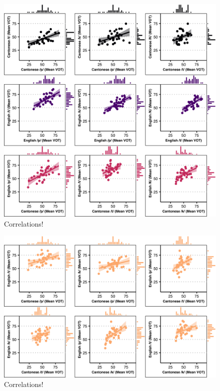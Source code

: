 \begin{figure}[htbp]
  \begin{center}
  \includegraphics[width=0.9\linewidth]{figures/ch4_correlations1_5in.png} 
  \caption{Correlations!}
  \label{ch4:fig:correlations1}
  \end{center}
\end{figure}

\begin{figure}[htbp]
  \begin{center}
  \includegraphics[width=0.9\linewidth]{figures/ch4_correlations2_5in.png} 
  \caption{Correlations!}
  \label{ch4:fig:correlations2}
  \end{center}
\end{figure}

